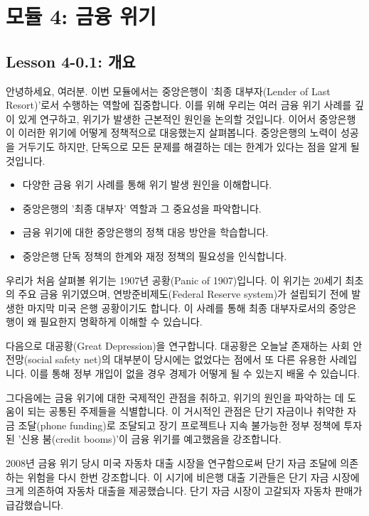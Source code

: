 \documentclass[11pt,a4paper]{book}
\theoremstyle{definition}
\begin{document}
\section{모듈 4: 금융 위기}

\subsection{Lesson 4-0.1: 개요}
안녕하세요, 여러분. 이번 모듈에서는 중앙은행이 '최종 대부자(Lender of Last Resort)'로서 수행하는 역할에 집중합니다. 이를 위해 우리는 여러 금융 위기 사례를 깊이 있게 연구하고, 위기가 발생한 근본적인 원인을 논의할 것입니다. 이어서 중앙은행이 이러한 위기에 어떻게 정책적으로 대응했는지 살펴봅니다. 중앙은행의 노력이 성공을 거두기도 하지만, 단독으로 모든 문제를 해결하는 데는 한계가 있다는 점을 알게 될 것입니다.

\begin{tcolorbox}[title={\textbf{모듈 4 학습 목표}}]
\begin{itemize}
    \item 다양한 금융 위기 사례를 통해 위기 발생 원인을 이해합니다.
    \item 중앙은행의 '최종 대부자' 역할과 그 중요성을 파악합니다.
    \item 금융 위기에 대한 중앙은행의 정책 대응 방안을 학습합니다.
    \item 중앙은행 단독 정책의 한계와 재정 정책의 필요성을 인식합니다.
\end{itemize}
\end{tcolorbox}

우리가 처음 살펴볼 위기는 1907년 공황(Panic of 1907)입니다. 이 위기는 20세기 최초의 주요 금융 위기였으며, 연방준비제도(Federal Reserve system)가 설립되기 전에 발생한 마지막 미국 은행 공황이기도 합니다. 이 사례를 통해 최종 대부자로서의 중앙은행이 왜 필요한지 명확하게 이해할 수 있습니다.

다음으로 대공황(Great Depression)을 연구합니다. 대공황은 오늘날 존재하는 사회 안전망(social safety net)의 대부분이 당시에는 없었다는 점에서 또 다른 유용한 사례입니다. 이를 통해 정부 개입이 없을 경우 경제가 어떻게 될 수 있는지 배울 수 있습니다.

그다음에는 금융 위기에 대한 국제적인 관점을 취하고, 위기의 원인을 파악하는 데 도움이 되는 공통된 주제들을 식별합니다. 이 거시적인 관점은 단기 자금이나 취약한 자금 조달(phone funding)로 조달되고 장기 프로젝트나 지속 불가능한 정부 정책에 투자된 '신용 붐(credit booms)'이 금융 위기를 예고했음을 강조합니다.

2008년 금융 위기 당시 미국 자동차 대출 시장을 연구함으로써 단기 자금 조달에 의존하는 위험을 다시 한번 강조합니다. 이 시기에 비은행 대출 기관들은 단기 자금 시장에 크게 의존하여 자동차 대출을 제공했습니다. 단기 자금 시장이 고갈되자 자동차 판매가 급감했습니다.
\end{document}

